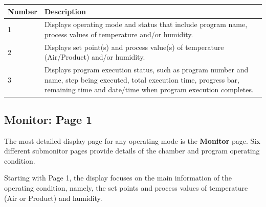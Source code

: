 \begin{longtable}[]{@{}ll@{}}
\toprule
\begin{minipage}[b]{0.36\columnwidth}\raggedright
Number\strut
\end{minipage} & \begin{minipage}[b]{0.58\columnwidth}\raggedright
Description\strut
\end{minipage}\tabularnewline
\midrule
\endhead
\begin{minipage}[t]{0.36\columnwidth}\raggedright
1\strut
\end{minipage} & \begin{minipage}[t]{0.58\columnwidth}\raggedright
Displays operating mode and status that include program name, process
values of temperature and/or humidity.\strut
\end{minipage}\tabularnewline
\begin{minipage}[t]{0.36\columnwidth}\raggedright
2\strut
\end{minipage} & \begin{minipage}[t]{0.58\columnwidth}\raggedright
Displays set point(s) and process value(s) of temperature (Air/Product)
and/or humidity.\strut
\end{minipage}\tabularnewline
\begin{minipage}[t]{0.36\columnwidth}\raggedright
3\strut
\end{minipage} & \begin{minipage}[t]{0.58\columnwidth}\raggedright
Displays program execution status, such as program number and name, step
being executed, total execution time, progress bar, remaining time and
date/time when program execution completes.\strut
\end{minipage}\tabularnewline
\bottomrule
\end{longtable}


\subsection{Monitor: Page 1}

The most detailed display page for any operating mode is the
\textbf{Monitor} page. Six different submonitor pages provide details of
the chamber and program operating condition.

Starting with Page 1, the display focuses on the main information of the
operating condition, namely, the set points and process values of
temperature (Air or Product) and humidity.

\pagebreak 

